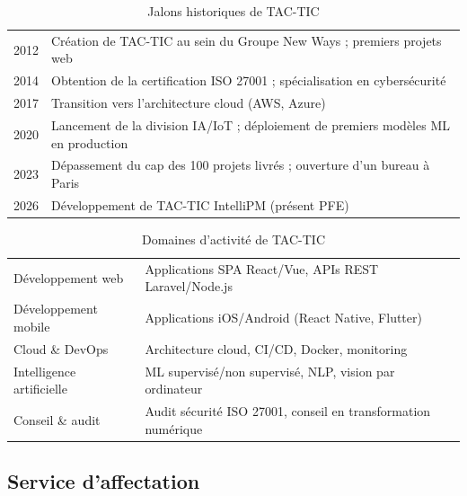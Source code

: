 \begin{table}[H]
  \centering
  \caption{Jalons historiques de TAC-TIC}
  \label{tab:historique_tactic}
  \begin{tabularx}{\textwidth}{C{2cm}X}
    \toprule
     &  \\
    \midrule
    2012 & Création de TAC-TIC au sein du Groupe New Ways ; premiers projets web \\
    2014 & Obtention de la certification ISO 27001 ; spécialisation en cybersécurité \\
    2017 & Transition vers l'architecture cloud (AWS, Azure) \\
    2020 & Lancement de la division IA/IoT ; déploiement de premiers modèles ML en production \\
    2023 & Dépassement du cap des 100 projets livrés ; ouverture d'un bureau à Paris \\
    2026 & Développement de TAC-TIC IntelliPM (présent PFE) \\
    \bottomrule
  \end{tabularx}
\end{table}

\begin{table}[H]
  \centering
  \caption{Domaines d'activité de TAC-TIC}
  \label{tab:domaines_tactic}
  \begin{tabularx}{\textwidth}{L{3.5cm}X}
    \toprule
     &  \\
    \midrule
    Développement web     & Applications SPA React/Vue, APIs REST Laravel/Node.js \\
    Développement mobile  & Applications iOS/Android (React Native, Flutter) \\
    Cloud \& DevOps       & Architecture cloud, CI/CD, Docker, monitoring \\
    Intelligence artificielle & ML supervisé/non supervisé, NLP, vision par ordinateur \\
    Conseil \& audit      & Audit sécurité ISO 27001, conseil en transformation numérique \\
    \bottomrule
  \end{tabularx}
\end{table}

\subsection{Service d'affectation}

